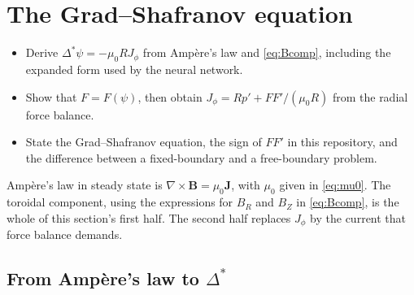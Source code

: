 \documentclass[11pt,a4paper,oneside,openany]{book}
\numberwithin{equation}{chapter}
\newcommand{\Dstar}{\Delta^{*}}
\newcommand{\grad}{\nabla}
\theoremstyle{definition}
\begin{document}
\chapter{The Grad--Shafranov equation}
\label{ch:gs}

\begin{objectives}
\begin{itemize}[leftmargin=1.2em]
\item Derive \(\Dstar\psi=-\mu_{0} R J_{\phi}\) from Amp\`ere's law and \eqref{eq:Bcomp}, including the expanded form used by the neural network.
\item Show that \(F=F(\psi)\), then obtain \(J_{\phi}=R p'+FF'/(\mu_{0} R)\) from the radial force balance.
\item State the Grad--Shafranov equation, the sign of \(FF'\) in this repository, and the difference between a fixed-boundary and a free-boundary problem.
\end{itemize}
\end{objectives}

Amp\`ere's law in steady state is \(\grad\times\mathbf{B}=\mu_{0}\mathbf{J}\), with \(\mu_{0}\) given in \eqref{eq:mu0}. The toroidal component, using the expressions for \(B_{R}\) and \(B_{Z}\) in \eqref{eq:Bcomp}, is the whole of this section's first half. The second half replaces \(J_{\phi}\) by the current that force balance demands.

\section{From Amp\`ere's law to \texorpdfstring{\(\Dstar\)}{Delta*}}
\end{document}
